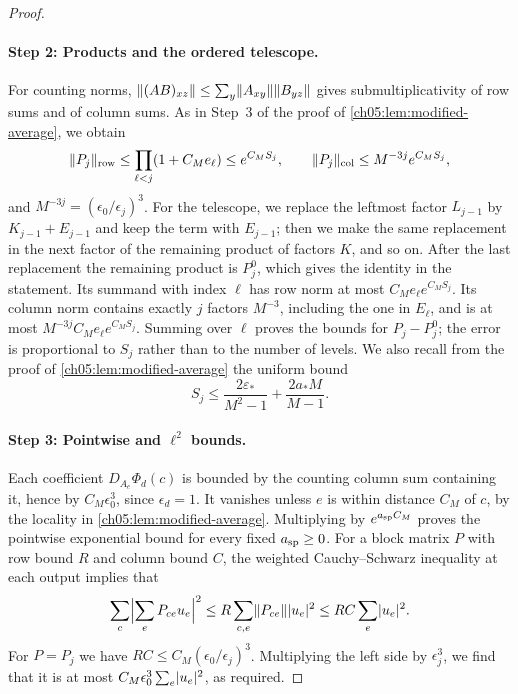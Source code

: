 \begin{proof}
\paragraph{Step 2: Products and the ordered telescope.}
For counting norms, $\lVert (AB)_{xz}\rVert\le\sum_y\lVert A_{xy}\rVert\lVert B_{yz}\rVert$ gives submultiplicativity of row sums and of column sums. As in Step~3 of the proof of \cref{ch05:lem:modified-average}, we obtain
\[
 \lVert P_j\rVert_{\mathrm{row}}\le\prod_{\ell<j}(1+C_Me_\ell)\le e^{C_MS_j},\qquad\lVert P_j\rVert_{\mathrm{col}}\le M^{-3j}e^{C_MS_j},
\]
and $M^{-3j}=(\epsilon_0/\epsilon_j)^3$. For the telescope, we replace the leftmost factor $L_{j-1}$ by $K_{j-1}+E_{j-1}$ and keep the term with $E_{j-1}$; then we make the same replacement in the next factor of the remaining product of factors $K$, and so on. After the last replacement the remaining product is $P_j^0$, which gives the identity in the statement. Its summand with index $\ell$ has row norm at most $C_Me_\ell e^{C_MS_j}$. Its column norm contains exactly $j$ factors $M^{-3}$, including the one in $E_\ell$, and is at most $M^{-3j}C_Me_\ell e^{C_MS_j}$. Summing over $\ell$ proves the bounds for $P_j-P_j^0$; the error is proportional to $S_j$ rather than to the number of levels. We also recall from the proof of \cref{ch05:lem:modified-average} the uniform bound
\begin{equation}\label{ch05:eq:error-sum}
 S_j\le\frac{2\varepsilon_*}{M^2-1}+\frac{2a_*M}{M-1}.
\end{equation}

\paragraph{Step 3: Pointwise and $\ell^2$ bounds.}
Each coefficient $D_{A_e}\Phi_d(c)$ is bounded by the counting column sum containing it, hence by $C_M\epsilon_0^3$, since $\epsilon_d=1$. It vanishes unless $e$ is within distance $C_M$ of $c$, by the locality in \cref{ch05:lem:modified-average}. Multiplying by $e^{a_{\mathrm{sp}} C_M}$ proves the pointwise exponential bound for every fixed $a_{\mathrm{sp}}\ge0$. For a block matrix $P$ with row bound $R$ and column bound $C$, the weighted Cauchy--Schwarz inequality at each output implies that
\[
 \sum_c\Bigl\lvert\sum_eP_{ce}u_e\Bigr\rvert^2\le R\sum_{c,e}\lVert P_{ce}\rVert\lvert u_e\rvert^2\le RC\sum_e\lvert u_e\rvert^2.
\]
For $P=P_j$ we have $RC\le C_M(\epsilon_0/\epsilon_j)^3$. Multiplying the left side by $\epsilon_j^3$, we find that it is at most $C_M\epsilon_0^3\sum_e\lvert u_e\rvert^2$, as required.


\end{proof}
